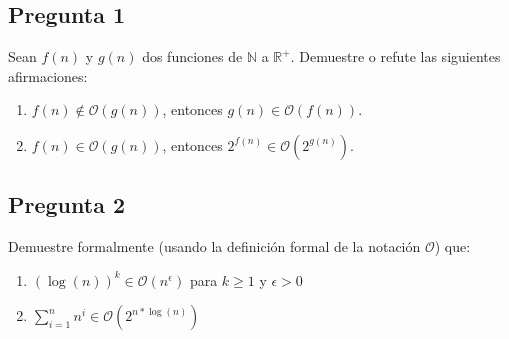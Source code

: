 \documentclass[letter]{article}
\begin{document}
	
	\begin{pregunta}{1} %
		\section*{Pregunta 1}
		Sean $f(n)$ y $g(n)$  dos funciones de $\mathbb{N}$ a $\mathbb{R}^{+}$. Demuestre o refute las siguientes afirmaciones:
		\begin{enumerate}
		\item $f(n) \not \in \mathcal{O}(g(n)) $, entonces $g(n)\in \mathcal{O}(f(n))$.
		\item $f(n)\in \mathcal{O}(g(n))$, entonces $2^{f(n)}\in \mathcal{O}(2^{g(n)})$.
		\end{enumerate}
		
	\end{pregunta}
	
	\begin{pregunta}{2}
		\section*{Pregunta 2}
		Demuestre formalmente (usando la definición formal de la notación $\mathcal{O}$) que:
		\begin{enumerate}
		\item $(\log(n))^{k}\in \mathcal{O}(n^{\epsilon})$ para $k\geq 1$ y $\epsilon >0$
		\item $\sum_{i=1}^{n}n^{i} \in \mathcal{O}(2^{n*\log(n)})$
		\end{enumerate}
		
	\end{pregunta}
\end{document}
